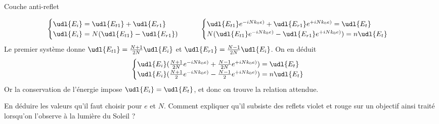 \begin{exo}[PC][2][TD]{Couche anti-reflet}
\begin{quest}
{$$
\begin{cases}
\udl{E_{i}} = \udl{E_{t1}} + \udl{E_{r1}} \\
\udl{E_{i}} = N(\udl{E_{t1}} - \udl{E_{r1}}) \\
\end{cases}\qquad
\begin{cases}
\udl{E_{t1}} e^{-i N k_0 e)} + \udl{E_{r1}} e^{+i N k_0 e)} = \udl{E_{t}}\\
N(\udl{E_{t1}} e^{-i N k_0 e)} - \udl{E_{r1}} e^{+i N k_0 e)}) = n\udl{E_{t}} \\
\end{cases}
$$
Le premier système donne $\udl{E_{t1}}=\frac{N+1}{2N}\udl{E_{i}}$ et $\udl{E_{r1}}=\frac{N-1}{2N}\udl{E_{i}}$. On en déduit
$$
\begin{cases}
\udl{E_{i}}(\frac{N+1}{2N} e^{-i N k_0 e)} + \frac{N-1}{2N} e^{+i N k_0 e)}) = \udl{E_{t}}\\
\udl{E_{i}}(\frac{N+1}{2} e^{-i N k_0 e)} - \frac{N-1}{2} e^{+i N k_0 e)}) = n\udl{E_{t}} \\
\end{cases}
$$
Or la conservation de l'énergie impose $\udl{E_{i}} = \udl{E_{t}}$, et donc on trouve la relation attendue.
}
\item En déduire les valeurs qu'il faut choisir pour $e$ et $N$. Comment expliquer qu'il subsiste des reflets violet et rouge sur un objectif ainsi traité lorsqu'on l'observe à la lumière du Soleil ?
\end{quest}
\end{exo}


